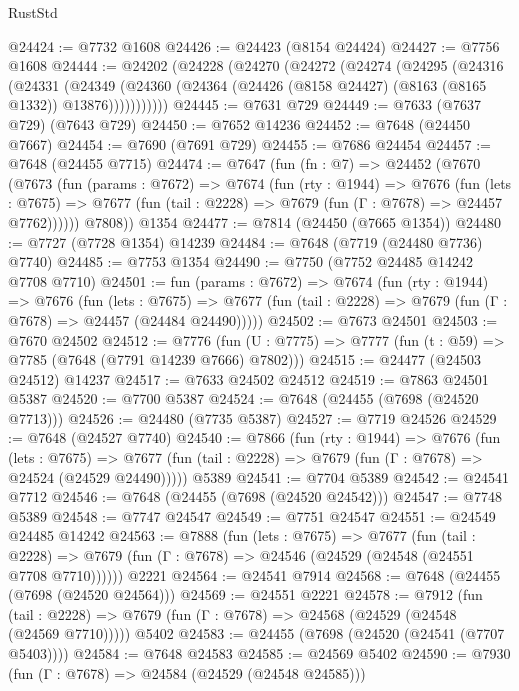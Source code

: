 \begin{lexlean}{RustStd}
\begin{coremodule}
{\begin{coremodule}
{{{{{{{{{{{{{{{{{{{{{{{{{{{{{{{{{{{{{{{{{{{{{{{{{{{{{@24424 := @7732 @1608
@24426 := @24423 (@8154 @24424)
@24427 := @7756 @1608
@24444 := @24202
    (@24228
      (@24270
        (@24272
          (@24274
            (@24295
              (@24316
                (@24331
                  (@24349
                    (@24360 (@24364 (@24426 (@8158 @24427) (@8163 (@8165 @1332)) @13876)))))))))))
@24445 := @7631 @729
@24449 := @7633 (@7637 @729) (@7643 @729)
@24450 := @7652 @14236
@24452 := @7648 (@24450 @7667)
@24454 := @7690 (@7691 @729)
@24455 := @7686 @24454
@24457 := @7648 (@24455 @7715)
@24474 := @7647
    (fun (fn : @7) =>
    @24452
      (@7670
        (@7673
          (fun (params : @7672) =>
          @7674
            (fun (rty : @1944) =>
            @7676
              (fun (lets : @7675) =>
              @7677 (fun (tail : @2228) => @7679 (fun (Γ : @7678) => @24457 @7762))))))
        @7808))
    @1354
@24477 := @7814 (@24450 (@7665 @1354))
@24480 := @7727 (@7728 @1354) @14239
@24484 := @7648 (@7719 (@24480 @7736) @7740)
@24485 := @7753 @1354
@24490 := @7750 (@7752 @24485 @14242 @7708 @7710)
@24501 := fun (params : @7672) =>
  @7674
    (fun (rty : @1944) =>
    @7676
      (fun (lets : @7675) =>
      @7677 (fun (tail : @2228) => @7679 (fun (Γ : @7678) => @24457 (@24484 @24490)))))
@24502 := @7673 @24501
@24503 := @7670 @24502
@24512 := @7776
    (fun (U : @7775) => @7777 (fun (t : @59) => @7785 (@7648 (@7791 @14239 @7666) @7802)))
@24515 := @24477 (@24503 @24512) @14237
@24517 := @7633 @24502 @24512
@24519 := @7863 @24501 @5387
@24520 := @7700 @5387
@24524 := @7648 (@24455 (@7698 (@24520 @7713)))
@24526 := @24480 (@7735 @5387)
@24527 := @7719 @24526
@24529 := @7648 (@24527 @7740)
@24540 := @7866
    (fun (rty : @1944) =>
    @7676
      (fun (lets : @7675) =>
      @7677 (fun (tail : @2228) => @7679 (fun (Γ : @7678) => @24524 (@24529 @24490)))))
    @5389
@24541 := @7704 @5389
@24542 := @24541 @7712
@24546 := @7648 (@24455 (@7698 (@24520 @24542)))
@24547 := @7748 @5389
@24548 := @7747 @24547
@24549 := @7751 @24547
@24551 := @24549 @24485 @14242
@24563 := @7888
    (fun (lets : @7675) =>
    @7677
      (fun (tail : @2228) =>
      @7679 (fun (Γ : @7678) => @24546 (@24529 (@24548 (@24551 @7708 @7710))))))
    @2221
@24564 := @24541 @7914
@24568 := @7648 (@24455 (@7698 (@24520 @24564)))
@24569 := @24551 @2221
@24578 := @7912
    (fun (tail : @2228) => @7679 (fun (Γ : @7678) => @24568 (@24529 (@24548 (@24569 @7710)))))
    @5402
@24583 := @24455 (@7698 (@24520 (@24541 (@7707 @5403))))
@24584 := @7648 @24583
@24585 := @24569 @5402
@24590 := @7930 (fun (Γ : @7678) => @24584 (@24529 (@24548 @24585)))
}}}}}}}}}}}}}}}}}}}}}}}}}}}}}}}}}}}}}}}}}}}}}}}}}}}}}
\end{coremodule}}
\end{coremodule}
\end{lexlean}
